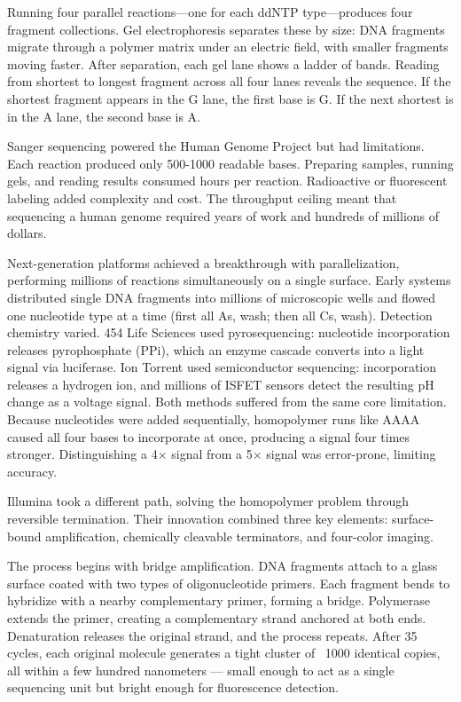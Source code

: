 Running four parallel reactions—one for each ddNTP type—produces four fragment collections. Gel electrophoresis separates these by size: DNA fragments migrate through a polymer matrix under an electric field, with smaller fragments moving faster. After separation, each gel lane shows a ladder of bands. Reading from shortest to longest fragment across all four lanes reveals the sequence. If the shortest fragment appears in the G lane, the first base is G. If the next shortest is in the A lane, the second base is A.

Sanger sequencing powered the Human Genome Project but had limitations. Each reaction produced only 500-1000 readable bases. Preparing samples, running gels, and reading results consumed hours per reaction. Radioactive or fluorescent labeling added complexity and cost. The throughput ceiling meant that sequencing a human genome required years of work and hundreds of millions of dollars.

Next-generation platforms achieved a breakthrough with parallelization, performing millions of reactions simultaneously on a single surface. Early systems distributed single DNA fragments into millions of microscopic wells and flowed one nucleotide type at a time (first all As, wash; then all Cs, wash). Detection chemistry varied. 454 Life Sciences used pyrosequencing: nucleotide incorporation releases pyrophosphate (PPi), which an enzyme cascade converts into a light signal via luciferase. Ion Torrent used semiconductor sequencing: incorporation releases a hydrogen ion, and millions of ISFET sensors detect the resulting pH change as a voltage signal. Both methods suffered from the same core limitation. Because nucleotides were added sequentially, homopolymer runs like AAAA caused all four bases to incorporate at once, producing a signal four times stronger. Distinguishing a 4× signal from a 5× signal was error-prone, limiting accuracy.

Illumina took a different path, solving the homopolymer problem through reversible termination. Their innovation combined three key elements: surface-bound amplification, chemically cleavable terminators, and four-color imaging.

The process begins with bridge amplification. DNA fragments attach to a glass surface coated with two types of oligonucleotide primers. Each fragment bends to hybridize with a nearby complementary primer, forming a bridge. Polymerase extends the primer, creating a complementary strand anchored at both ends. Denaturation releases the original strand, and the process repeats. After 35 cycles, each original molecule generates a tight cluster of ~1000 identical copies, all within a few hundred nanometers — small enough to act as a single sequencing unit but bright enough for fluorescence detection.

